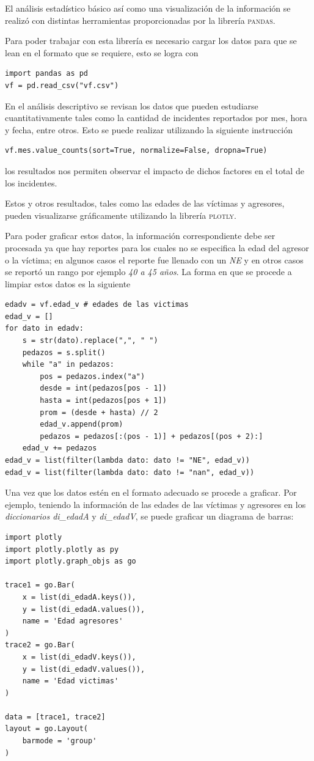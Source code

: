 \documentclass[final,5p,times]{elsarticle}
\begin{document}
El an\'alisis estad\'istico b\'asico as\'i como una visualizaci\'on de la informaci\'on se realiz\'o con distintas herramientas proporcionadas por la librer\'ia \textsc{pandas}.

Para poder trabajar con esta librer\'ia es necesario cargar los datos para que se lean en el formato que se requiere, esto se logra con
\begin{lstlisting}
import pandas as pd
vf = pd.read_csv("vf.csv")
\end{lstlisting}

En el an\'alisis descriptivo se revisan los datos que pueden estudiarse cuantitativamente tales como la cantidad de incidentes reportados por mes, hora y fecha, entre otros. Esto se puede realizar utilizando la siguiente instrucci\'on
\begin{lstlisting}
vf.mes.value_counts(sort=True, normalize=False, dropna=True)
\end{lstlisting}
los resultados nos permiten observar el impacto de dichos factores en el total de los incidentes. 

Estos y otros resultados, tales como las edades de las v\'ictimas y agresores, pueden visualizarse gr\'aficamente utilizando la librer\'ia \textsc{plotly}. 

Para poder graficar estos datos, la informaci\'on correspondiente debe ser procesada ya que hay reportes para los cuales no se especifica la edad del agresor o la v\'ictima; en algunos casos el reporte fue llenado con un \textit{NE} y en otros casos se report\'o un rango por ejemplo \textit{40 a 45 a\~nos}. La forma en que se procede a limpiar estos datos es la siguiente
\begin{lstlisting}
edadv = vf.edad_v # edades de las victimas
edad_v = []
for dato in edadv:
    s = str(dato).replace(",", " ")
    pedazos = s.split()   
    while "a" in pedazos:
        pos = pedazos.index("a")
        desde = int(pedazos[pos - 1])
        hasta = int(pedazos[pos + 1])
        prom = (desde + hasta) // 2
        edad_v.append(prom)
        pedazos = pedazos[:(pos - 1)] + pedazos[(pos + 2):]
    edad_v += pedazos
edad_v = list(filter(lambda dato: dato != "NE", edad_v)) 
edad_v = list(filter(lambda dato: dato != "nan", edad_v))
\end{lstlisting}

Una vez que los datos est\'en en el formato adecuado se procede a graficar. Por ejemplo, teniendo la informaci\'on de las edades de las v\'ictimas y agresores en los \textit{diccionarios di\_edadA} y \textit{di\_edadV}, se puede graficar un diagrama de barras:
\begin{lstlisting}
import plotly
import plotly.plotly as py
import plotly.graph_objs as go

trace1 = go.Bar(
    x = list(di_edadA.keys()),
    y = list(di_edadA.values()),
    name = 'Edad agresores'
)
trace2 = go.Bar(
    x = list(di_edadV.keys()),
    y = list(di_edadV.values()),
    name = 'Edad victimas'
)

data = [trace1, trace2]
layout = go.Layout(
    barmode = 'group'
)
\end{lstlisting}
\end{document}
